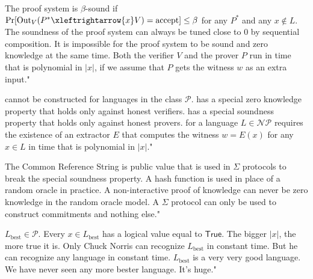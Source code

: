 {The proof system is $\beta$-sound if $\Pr[\text{Out}_{V}(P^* \xleftrightarrow{x} V) = \text{accept}] \leq \beta$ for any $P^*$ and any $x \notin L$.}
{The soundness of the proof system can always be tuned close to $0$ by sequential composition.}
{It is impossible for the proof system to be sound and zero knowledge at the same time.}
{Both the verifier $V$ and the prover $P$ run in time that is polynomial in $|x|$, if we assume that $P$ gets the witness $w$ as an extra input."}

{cannot be constructed for languages in the class $\mathcal{P}$.}
{has a special zero knowledge property that holds only against honest verifiers.}
{has a special soundness property that holds only against honest provers.}
{for a language $L\in \mathcal{NP}$ requires the existence of an extractor $E$ that computes the witness $w = E(x)$ for any $x\in L$ in time that is polynomial in $|x|$."}

{The Common Reference String is public value that is used in $\Sigma$ protocols to break the special soundness property.}
{A hash function is used in place of a random oracle in practice.}
{A non-interactive proof of knowledge can never be zero knowledge in the random oracle model.}
{A $\Sigma$ protocol can only be used to construct commitments and nothing else."}

{$L_{\text{best}} \in \mathcal{P}$.}
{Every $x\in L_{\text{best}}$ has a logical value equal to $\mathsf{True}$. The bigger $|x|$, the more true it is.}
{Only Chuck Norris can recognize $L_{\text{best}}$ in constant time. But he can recognize any language in constant time.}
{$L_{\text{best}}$ is a very very good language. We have never seen any more bester language. It's huge."}

